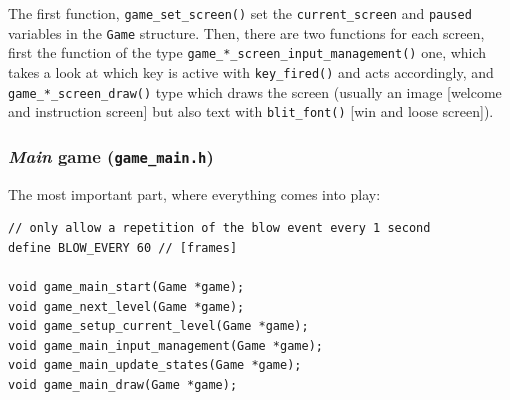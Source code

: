 \documentclass[12pt,a4paper]{article}
\newcommand{\cc}[1]{\texttt{#1}}
\begin{document}
The first function, \cc{game_set_screen()} set the \cc{current_screen} and \cc{paused} variables in the \cc{Game} structure. Then, there are two functions for each screen, first the function of the type \cc{game_*_screen_input_management()} one, which takes a look at which key is active with \cc{key_fired()} and acts accordingly, and \cc{game_*_screen_draw()} type which draws the screen (usually an image [welcome and instruction screen] but also text with \cc{blit_font()} [win and loose screen]).

\subsubsection{\textit{Main} game (\texttt{game\_main.h})}

The most important part, where everything comes into play:\begin{verbatim}
// only allow a repetition of the blow event every 1 second
define BLOW_EVERY 60 // [frames]

void game_main_start(Game *game);
void game_next_level(Game *game);
void game_setup_current_level(Game *game);
void game_main_input_management(Game *game);
void game_main_update_states(Game *game);
void game_main_draw(Game *game);
\end{verbatim}
\end{document}
